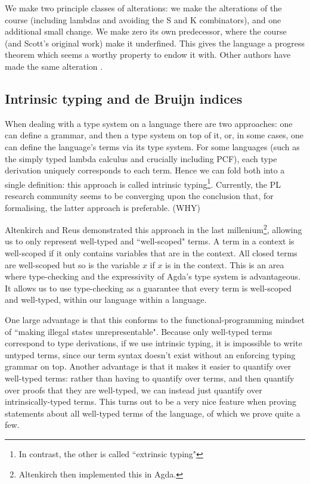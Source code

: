\documentclass[12pt,a4paper,twoside,openright]{report}
\begin{document}
We make two principle classes of alterations: we make the alterations of the course (including lambdas and avoiding the S and K combinators), and one additional small change. We make zero its own predecessor, where the course (and Scott's original work) make it underfined. This gives the language a progress theorem which seems a worthy property to endow it with. Other authors have made the same alteration \cite{De-Jong}.  
\subsection{Intrinsic typing and de Bruijn indices} 
When dealing with a type system on a language there are two approaches: one can define a grammar, and then a type system on top of it, or, in some cases, one can define the language's terms via its type system. For some languages (such as the simply typed lambda calculus and crucially including PCF), each type derivation uniquely corresponds to each term. Hence we can fold both into a single definition: this approach is called intrinsic typing\footnote{In contrast, the other is called ``extrinsic typing"}. Currently, the PL research community seems to be converging upon the conclusion that, for formalising, the latter approach is preferable. (WHY)

Altenkirch and Reus \cite{Alt} demonstrated this approach in the last millenium\footnote{Altenkirch then implemented this in Agda\cite{Alt2}.}, allowing us to only represent well-typed and ``well-scoped" terms. A term in a context is well-scoped if it only contains variables that are in the context. All closed terms are well-scoped but so is the variable $x$ if $x$ is in the context. This is an area where type-checking and the expressivity of Agda's type system is advantageous. It allows us to use type-checking as a guarantee that every term is well-scoped and well-typed, within our language within a language. 

One large advantage is that this conforms to the functional-programming mindset of ``making illegal states unrepresentable". Because only well-typed terms correspond to type derivations, if we use intrinsic typing, it is impossible to write untyped terms, since our term syntax doesn't exist without an enforcing typing grammar on top. Another advantage is that it makes it easier to quantify over well-typed terms: rather than having to quantify over terms, and then quantify over proofs that they are well-typed, we can instead just quantify over intrinsically-typed terms. This turns out to be a very nice feature when proving statements about all well-typed terms of the language, of which we prove quite a few.
\end{document}
